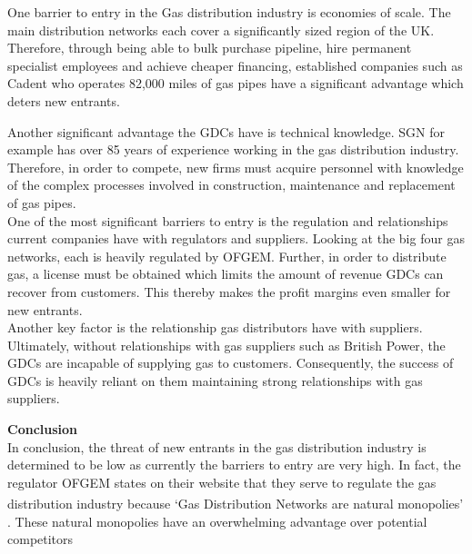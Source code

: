 \documentclass[11pt]{article}		%
\newcommand{\supercite}[1]{\textsuperscript{\cite{#1}}}		%
\begin{document}
				One barrier to entry in the Gas distribution industry is economies of scale. The main distribution networks each cover a significantly sized region of the UK. Therefore, through being able to bulk purchase pipeline, hire permanent specialist employees and achieve cheaper financing, established companies such as Cadent who operates 82,000 miles of gas pipes have a significant advantage which deters new entrants. \\
				\begin{floatingfigure}[r]{0pt} \end{floatingfigure}
				Another significant advantage the GDCs have is technical knowledge. SGN for example has over 85 years of experience working in the gas distribution industry. Therefore, in order to compete, new firms must acquire personnel with knowledge of the complex processes involved in construction, maintenance and replacement of gas pipes. \\
				One of the most significant barriers to entry is the regulation and relationships current companies have with regulators and suppliers. Looking at the big four gas networks, each is heavily regulated by OFGEM. Further, in order to distribute gas, a license must be obtained which limits the amount of revenue GDCs can recover from customers. This thereby makes the profit margins even smaller for new entrants. \\
	            \hspace*{3ex}Another key factor is the relationship gas distributors have with suppliers. Ultimately, without relationships with gas suppliers such as British Power, the GDCs are incapable of supplying gas to customers. Consequently, the success of GDCs is heavily reliant on them maintaining strong relationships with gas suppliers.

			    \textbf{Conclusion}\\
                In conclusion, the threat of new entrants in the gas distribution industry is determined to be low as currently the barriers to entry are very high. In fact, the regulator OFGEM states on their website that they serve to regulate the gas distribution industry because ‘Gas Distribution Networks are natural monopolies’ \supercite{ofgemquote}. These natural monopolies have an overwhelming advantage over potential competitors
        
\end{document}
